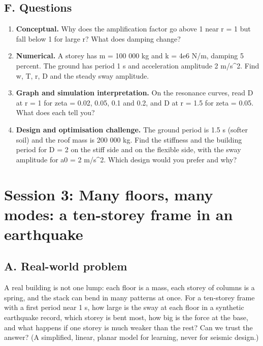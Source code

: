 \documentclass[11pt,a4paper]{article}
\begin{document}
\subsection*{F. Questions}
\begin{enumerate}[nosep]
\item \textbf{Conceptual.} Why does the amplification factor go above 1 near r = 1 but fall below 1 for large r? What does damping change?
\item \textbf{Numerical.} A storey has m = 100 000 kg and k = 4e6 N/m, damping 5 percent. The ground has period 1 s and acceleration amplitude 2 m/s\textasciicircum{}2. Find w, T, r, D and the steady sway amplitude.
\item \textbf{Graph and simulation interpretation.} On the resonance curves, read D at r = 1 for zeta = 0.02, 0.05, 0.1 and 0.2, and D at r = 1.5 for zeta = 0.05. What does each tell you?
\item \textbf{Design and optimisation challenge.} The ground period is 1.5 s (softer soil) and the roof mass is 200 000 kg. Find the stiffness and the building period for D = 2 on the stiff side and on the flexible side, with the sway amplitude for a0 = 2 m/s\textasciicircum{}2. Which design would you prefer and why?
\end{enumerate}

\section{Session 3: Many floors, many modes: a ten-storey frame in an earthquake}

\subsection*{A. Real-world problem}
A real building is not one lump: each floor is a mass, each storey of columns is a spring, and the stack can bend in many patterns at once. For a ten-storey frame with a first period near 1 s, how large is the sway at each floor in a synthetic earthquake record, which storey is bent most, how big is the force at the base, and what happens if one storey is much weaker than the rest? Can we trust the answer? (A simplified, linear, planar model for learning, never for seismic design.)
\end{document}
